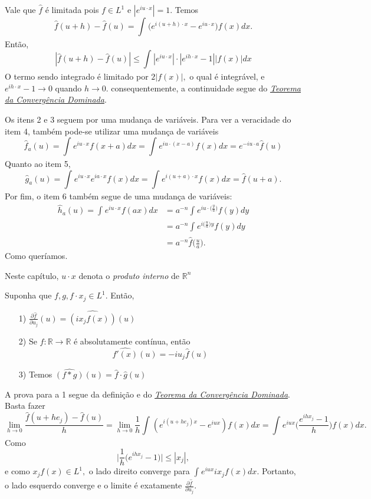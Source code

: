 \documentclass[measure_theory.tex]{subfiles}
\begin{document}
\begin{proof*}
	Vale que \(\hat{f}\) é limitada pois \(f\in L^{1}\) e \(|e^{iu \cdot x}| = 1\). Temos
	\[
		\hat{f}(u+h) - \hat{f}(u) = \int_{}^{}\biggl(e^{i(u+h)\cdot x} - e^{iu \cdot x}\biggr)f(x)dx.
	\]
	Então,
	\[
		|\hat{f}(u+h) - \hat{f}(u)|\leq \int_{}^{}|e^{iu \cdot x}|\cdot |e^{ih \cdot x} - 1||f(x)|dx
	\]
	O termo sendo integrado é limitado por \(2|f(x)|,\) o qual é integrável, e \(e^{ih \cdot x} - 1\to 0\) quando \(h\to 0\). consequentemente,
	a continuidade segue do \hyperlink{dominated_convergence}{\textit{Teorema da Convergência Dominada}}.

	Os itens 2 e 3 seguem por uma mudança de variáveis. Para ver a veracidade do item 4, também pode-se utilizar uma mudança de variáveis
	\[
		\hat{f}_{a}(u) = \int_{}^{}e^{iu \cdot x}f(x+a)dx = \int_{}^{}e^{iu \cdot (x-a)}f(x)dx = e^{-iu \cdot a}\hat{f}(u)
	\]
	Quanto ao item 5,
	\[
		\hat{g}_{a}(u) = \int_{}^{}e^{iu \cdot x}e^{ia \cdot x}f(x)dx = \int_{}^{}e^{i(u+a)\cdot x}f(x)dx = \hat{f}(u+a).
	\]
	Por fim, o item 6 também segue de uma mudança de variáveis:
	\begin{align*}
		\hat{h}_{a}(u) = \int_{}^{}e^{iu \cdot x}f(ax)dx & = a^{-n}\int_{}^{}e^{iu \cdot \biggl(\frac{y}{a}\biggr)}f(y)dy \\
		                                                 & = a^{-n}\int_{}^{}e^{i \biggl(\frac{u}{a}\biggr)y}f(y)dy       \\
		                                                 & = a^{-n}\hat{f}\biggl(\frac{u}{a}\biggr).
	\end{align*}
	Como queríamos. \qedsymbol
\end{proof*}
Neste capítulo, \(u \cdot x\) denota o \textit{produto interno} de \(\mathbb{R}^{n}\)
\begin{prop*}
	Suponha que \(f, g, f \cdot x_{j}\in L^{1}.\) Então,
	\begin{itemize}
		\item[1)] \(\frac{\partial \hat{f}}{\partial u_{j}}(u) = \widehat{(ix_{j}f(x))}(u)\)
		\item[2)] Se \(f:\mathbb{R}\rightarrow \mathbb{R}\) é absolutamente contínua, então
		      \[
			      \hat{f'(x)}(u) = -iu_{j}\hat{f}(u)
		      \]
		\item[3)] Temos \(\widehat{(f*g)}(u) = \hat{f}\cdot \hat{g}(u)\)
	\end{itemize}
\end{prop*}
\begin{proof*}
	A prova para a 1 segue da definição e do \hyperlink{dominated_convergence}{\textit{Teorema da Convergência Dominada}}. Basta fazer
	\[
		\lim_{h\to 0}\frac{\hat{f}(u+he_{j}) - \hat{f}(u)}{h} = \lim_{h\to 0} \frac{1}{h}\int_{}^{}(e^{i(u+he_{j})x}-e^{iux})f(x)dx = \int_{}^{}e^{iux}\biggl(\frac{e^{ihx_{j}} -1}{h}\biggr)f(x)dx.
	\]
	Como
	\[
		\biggl\vert \frac{1}{h}\biggl(e^{ihx_{j}}-1\biggr) \biggr\vert\leq |x_{j}|,
	\]
	e como \(x_{j}f(x)\in L^{1},\) o lado direito converge para \(\int_{}^{}e^{iux}ix_{j}f(x)dx\). Portanto, o lado esquerdo converge e o limite é exatamente \(\frac{\partial \hat{f}}{\partial u_{j}}\).
\end{proof*}
\end{document}
